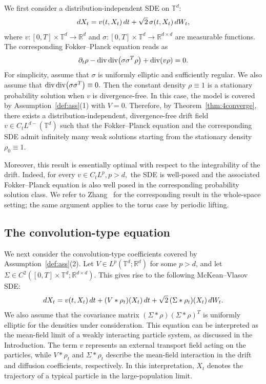 \documentclass[10pt,a4paper]{amsart}
\numberwithin{equation}{section}
\def\dif{{\mathord{{\rm d}}}}
\def\dif{{\mathord{{\rm d}}}}
\begin{document}
We first consider a distribution-independent SDE on $\mathbb{T}^d$:
\begin{align}
    \dif X_t
    =
    v(t,X_t)\,\dif t
    +
    \sqrt{2}\,\sigma(t,X_t)\,\dif W_t ,
    \notag
\end{align}
where
$v:[0,T]\times\mathbb{T}^d\to\mathbb{R}^d$ and
$\sigma:[0,T]\times\mathbb{T}^d\to\mathbb{R}^{d\times d}$ are measurable
functions. The corresponding Fokker--Planck equation reads as
\begin{align}
\partial_t\rho
-
\operatorname{div}\operatorname{div}\bigl(\sigma\sigma^T\rho\bigr)
+
\operatorname{div}(v\rho)
=
0 .
\notag
\end{align}
For simplicity, assume that $\sigma$ is uniformly elliptic and sufficiently
regular. We also assume that
$
\operatorname{div}\operatorname{div}\bigl(\sigma\sigma^T\bigr)
\equiv 0.
\notag
$ Then the constant density $\rho\equiv1$ is a
stationary probability solution when $v$ is divergence-free. In this case, the
model is covered by Assumption~\ref{def:ass}\textnormal{(1)} with $V=0$.
Therefore, by Theorem~\ref{thm:4converge}, there exists a
distribution-independent, divergence-free drift field
$
v\in C_tL^{d-}(\mathbb{T}^d)
$
such that the Fokker--Planck equation and the corresponding SDE admit
infinitely many weak solutions starting from the stationary density
$\rho_0\equiv1$.

Moreover, this result is essentially optimal with respect to the integrability
of the drift. Indeed, for every
$
v\in C_tL^p,
p>d,$
the SDE is  well-posed and the associated Fokker--Planck equation
is also well posed in the corresponding probability solution class. We refer
to Zhang~\cite{Zha11} for the corresponding result in the whole-space setting;
the same argument applies to the torus case by periodic lifting.

\subsection{The convolution-type equation}

We next consider the convolution-type coefficients covered by
Assumption~\ref{def:ass}\textnormal{(2)}. Let
$V\in L^p(\mathbb{T}^d;\mathbb{R}^d)$ for some $p>d$, and let
$\Sigma\in C^2([0,T]\times\mathbb{T}^d;\mathbb{R}^{d\times d})$. This gives
rise to the following McKean--Vlasov SDE:
\begin{align*}
\dif X_t
=
v(t,X_t)\,\dif t
+
(V*\rho_t)(X_t)\,\dif t
+
\sqrt{2}\,(\Sigma*\rho_t)(X_t)\,\dif W_t .
\end{align*}  We also assume that
the covariance matrix
$
(\Sigma*\rho)(\Sigma*\rho)^T
$
is uniformly elliptic for the densities under consideration.
This equation can be interpreted as the mean-field limit of a weakly
interacting particle system, as discussed in the Introduction. The term $v$
represents an external transport field acting on the particles, while
$V*\rho_t$ and $\Sigma*\rho_t$ describe the mean-field interaction in the
drift and diffusion coefficients, respectively. In this interpretation,
$X_t$ denotes the trajectory of a typical particle in the large-population
limit.
\end{document}

